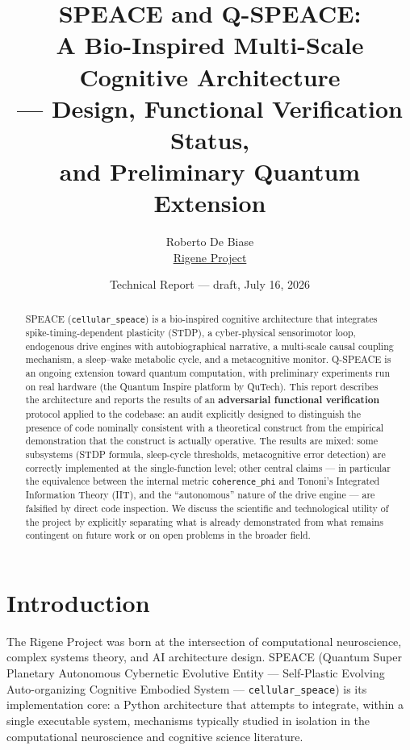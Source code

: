 \documentclass[11pt,a4paper]{article}
\title{\textbf{SPEACE and Q-SPEACE}:\\ A Bio-Inspired Multi-Scale Cognitive Architecture\\
--- Design, Functional Verification Status,\\ and Preliminary Quantum Extension}
\author{Roberto De Biase\\\href{https://rigeneproject.org}{Rigene Project}}
\date{Technical Report --- draft, July 16, 2026}
\newcommand{\code}[1]{\texttt{#1}}
\newcommand{\coherencephi}{\code{coherence\_phi}}
\begin{document}
\maketitle
\thispagestyle{empty}

\begin{abstract}
\noindent
\sloppy
SPEACE (\code{cellular\_speace}) is a bio-inspired cognitive architecture that integrates spike-timing-dependent plasticity (STDP), a cyber-physical sensorimotor loop, endogenous drive engines with autobiographical narrative, a multi-scale causal coupling mechanism, a sleep--wake metabolic cycle, and a metacognitive monitor. Q-SPEACE is an ongoing extension toward quantum computation, with preliminary experiments run on real hardware (the Quantum Inspire platform by QuTech). This report describes the architecture and reports the results of an \textbf{adversarial functional verification} protocol applied to the codebase: an audit explicitly designed to distinguish the presence of code nominally consistent with a theoretical construct from the empirical demonstration that the construct is actually operative. The results are mixed: some subsystems (STDP formula, sleep-cycle thresholds, metacognitive error detection) are correctly implemented at the single-function level; other central claims --- in particular the equivalence between the internal metric \coherencephi{} and Tononi's Integrated Information Theory (IIT), and the ``autonomous'' nature of the drive engine --- are falsified by direct code inspection. We discuss the scientific and technological utility of the project by explicitly separating what is already demonstrated from what remains contingent on future work or on open problems in the broader field.
\end{abstract}

\newpage
\tableofcontents
\newpage

\section{Introduction}
\label{sec:intro}

The Rigene Project was born at the intersection of computational neuroscience, complex systems theory, and AI architecture design. SPEACE (Quantum Super Planetary Autonomous Cybernetic Evolutive Entity --- Self-Plastic Evolving Auto-organizing Cognitive Embodied System --- \code{cellular\_speace}) is its implementation core: a Python architecture that attempts to integrate, within a single executable system, mechanisms typically studied in isolation in the computational neuroscience and cognitive science literature.
\end{document}
